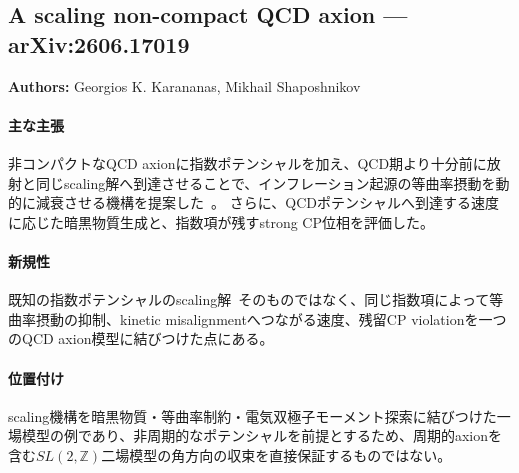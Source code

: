 \subsection{A scaling non-compact QCD axion --- arXiv:2606.17019}

\textbf{Authors:} Georgios K. Karananas, Mikhail Shaposhnikov

\paragraph{主な主張}
非コンパクトなQCD axionに指数ポテンシャルを加え、QCD期より十分前に放射と同じscaling解へ到達させることで、インフレーション起源の等曲率摂動を動的に減衰させる機構を提案した~\cite{Karananas:2026scaling}。
さらに、QCDポテンシャルへ到達する速度に応じた暗黒物質生成と、指数項が残すstrong CP位相を評価した。

\paragraph{新規性}
既知の指数ポテンシャルのscaling解~\cite{Copeland:1997scaling}そのものではなく、同じ指数項によって等曲率摂動の抑制、kinetic misalignmentへつながる速度、残留CP violationを一つのQCD axion模型に結びつけた点にある。

\paragraph{位置付け}
scaling機構を暗黒物質・等曲率制約・電気双極子モーメント探索に結びつけた一場模型の例であり、非周期的なポテンシャルを前提とするため、周期的axionを含む$SL(2,\mathbb{Z})$二場模型の角方向の収束を直接保証するものではない。
